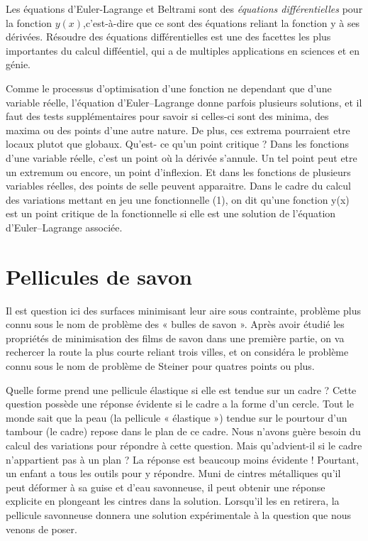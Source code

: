 \documentclass[11pt,a4paper]{report}%
\begin{document}
		Les équations d'Euler-Lagrange et Beltrami sont des \textit{équations différentielles} pour la fonction $y(x)$,c'est-à-dire que ce sont des équations reliant la fonction y à ses dérivées. Résoudre des équations différentielles est une des facettes les plus importantes du calcul difféentiel, qui a de multiples applications en sciences et en génie.
		
		Comme le processus d'optimisation d'une fonction ne dependant que d'une variable réelle, l'équation d'Euler–Lagrange donne parfois plusieurs solutions, et il faut des tests
		supplémentaires pour savoir si celles-ci sont des minima, des maxima ou des points d'une
		autre nature. De plus, ces extrema pourraient etre locaux plutot que globaux. Qu'est-
		ce qu'un point critique ? Dans les fonctions d'une variable réelle, c’est un point où la
		dérivée s'annule. Un tel point peut etre un extremum ou encore, un point d'inflexion. Et
		dans les fonctions de plusieurs variables réelles, des points de selle peuvent apparaitre.
		Dans le cadre du calcul des variations mettant en jeu une fonctionnelle (1), on dit
		qu'une fonction y(x) est un point critique de la fonctionnelle si elle est une solution de
		l'équation d'Euler–Lagrange associée.
	
	
	
	\section{Pellicules de savon}
	Il est question ici des surfaces minimisant leur aire sous contrainte, problème plus connu sous le nom de problème des « bulles de savon ». Après avoir étudié les propriétés de minimisation des films de savon dans une première partie, on va rechercer la route la plus courte reliant trois villes, et on considéra le problème connu sous le nom de problème de Steiner pour quatres points ou plus.
	
	Quelle forme prend une pellicule  élastique si elle est tendue sur un cadre ? Cette
	question possède une réponse  évidente si le cadre a la forme d’un cercle. Tout le monde
	sait que la peau (la pellicule « élastique ») tendue sur le pourtour d’un tambour (le cadre)
	repose dans le plan de ce cadre. Nous n’avons guère besoin du calcul des variations pour
	répondre à cette question. Mais qu’advient-il si le cadre n’appartient pas à un plan ?
	La réponse est beaucoup moins  évidente ! Pourtant, un enfant a tous les outils pour y
	répondre. Muni de cintres métalliques qu’il peut déformer à sa guise et d’eau savonneuse,
	il peut obtenir une réponse explicite en plongeant les cintres dans la solution. Lorsqu’il
	les en retirera, la pellicule savonneuse donnera une solution expérimentale à la question
	que nous venons de poser.
	
\end{document}
